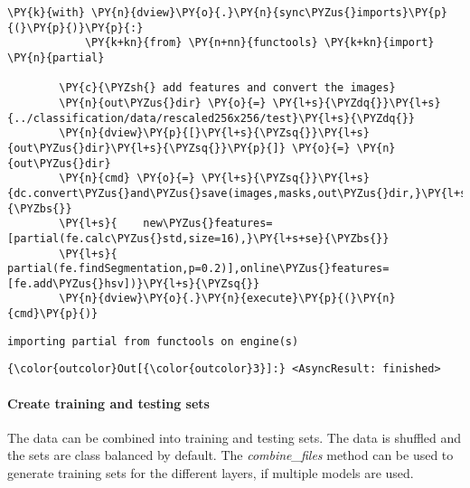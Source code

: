\begin{Verbatim}[commandchars=\\\{\}]
        \PY{k}{with} \PY{n}{dview}\PY{o}{.}\PY{n}{sync\PYZus{}imports}\PY{p}{(}\PY{p}{)}\PY{p}{:}
            \PY{k+kn}{from} \PY{n+nn}{functools} \PY{k+kn}{import} \PY{n}{partial}
        
        \PY{c}{\PYZsh{} add features and convert the images}
        \PY{n}{out\PYZus{}dir} \PY{o}{=} \PY{l+s}{\PYZdq{}}\PY{l+s}{../classification/data/rescaled256x256/test}\PY{l+s}{\PYZdq{}}
        \PY{n}{dview}\PY{p}{[}\PY{l+s}{\PYZsq{}}\PY{l+s}{out\PYZus{}dir}\PY{l+s}{\PYZsq{}}\PY{p}{]} \PY{o}{=} \PY{n}{out\PYZus{}dir}
        \PY{n}{cmd} \PY{o}{=} \PY{l+s}{\PYZsq{}}\PY{l+s}{dc.convert\PYZus{}and\PYZus{}save(images,masks,out\PYZus{}dir,}\PY{l+s+se}{\PYZbs{}}
        \PY{l+s}{    new\PYZus{}features=[partial(fe.calc\PYZus{}std,size=16),}\PY{l+s+se}{\PYZbs{}}
        \PY{l+s}{    partial(fe.findSegmentation,p=0.2)],online\PYZus{}features=[fe.add\PYZus{}hsv])}\PY{l+s}{\PYZsq{}}
        \PY{n}{dview}\PY{o}{.}\PY{n}{execute}\PY{p}{(}\PY{n}{cmd}\PY{p}{)}
\end{Verbatim}

    \begin{Verbatim}[commandchars=\\\{\}]
importing partial from functools on engine(s)
    \end{Verbatim}

            \begin{Verbatim}[commandchars=\\\{\}]
{\color{outcolor}Out[{\color{outcolor}3}]:} <AsyncResult: finished>
\end{Verbatim}
        

    \paragraph{Create training and testing sets}


    The data can be combined into training and testing sets. The data is
shuffled and the sets are class balanced by default. The
\emph{combine\_files} method can be used to generate training sets for
the different layers, if multiple models are used.

